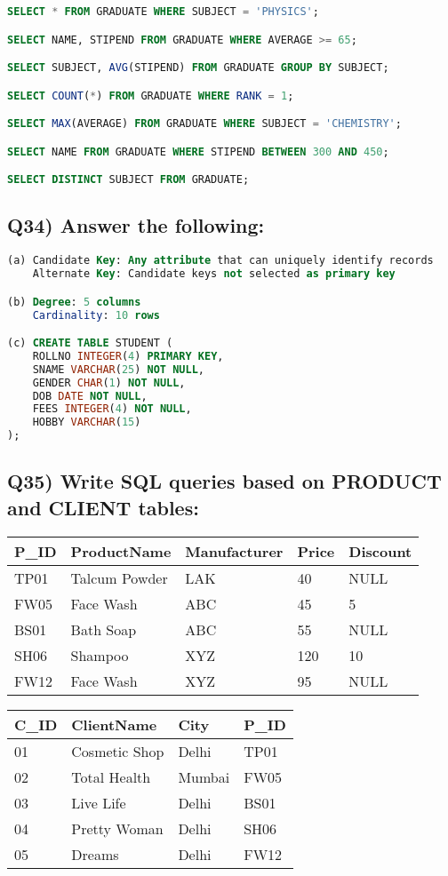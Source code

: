 \documentclass{article}
\begin{document}
\begin{lstlisting}[language=SQL]
SELECT * FROM GRADUATE WHERE SUBJECT = 'PHYSICS';

SELECT NAME, STIPEND FROM GRADUATE WHERE AVERAGE >= 65;

SELECT SUBJECT, AVG(STIPEND) FROM GRADUATE GROUP BY SUBJECT;

SELECT COUNT(*) FROM GRADUATE WHERE RANK = 1;

SELECT MAX(AVERAGE) FROM GRADUATE WHERE SUBJECT = 'CHEMISTRY';

SELECT NAME FROM GRADUATE WHERE STIPEND BETWEEN 300 AND 450;

SELECT DISTINCT SUBJECT FROM GRADUATE;
\end{lstlisting}

\subsection*{Q34) Answer the following:}
\begin{lstlisting}[language=SQL]
(a) Candidate Key: Any attribute that can uniquely identify records
    Alternate Key: Candidate keys not selected as primary key

(b) Degree: 5 columns
    Cardinality: 10 rows

(c) CREATE TABLE STUDENT (
    ROLLNO INTEGER(4) PRIMARY KEY,
    SNAME VARCHAR(25) NOT NULL,
    GENDER CHAR(1) NOT NULL,
    DOB DATE NOT NULL,
    FEES INTEGER(4) NOT NULL,
    HOBBY VARCHAR(15)
);
\end{lstlisting}

\subsection*{Q35) Write SQL queries based on PRODUCT and CLIENT tables:}

\begin{tabular}{|l|l|l|l|l|}
\hline
P\_ID & ProductName & Manufacturer & Price & Discount \\
\hline
TP01 & Talcum Powder & LAK & 40 & NULL \\
FW05 & Face Wash & ABC & 45 & 5 \\
BS01 & Bath Soap & ABC & 55 & NULL \\
SH06 & Shampoo & XYZ & 120 & 10 \\
FW12 & Face Wash & XYZ & 95 & NULL \\
\hline
\end{tabular}

\begin{tabular}{|l|l|l|l|}
\hline
C\_ID & ClientName & City & P\_ID \\
\hline
01 & Cosmetic Shop & Delhi & TP01 \\
02 & Total Health & Mumbai & FW05 \\
03 & Live Life & Delhi & BS01 \\
04 & Pretty Woman & Delhi & SH06 \\
05 & Dreams & Delhi & FW12 \\
\hline
\end{tabular}
\end{document}
